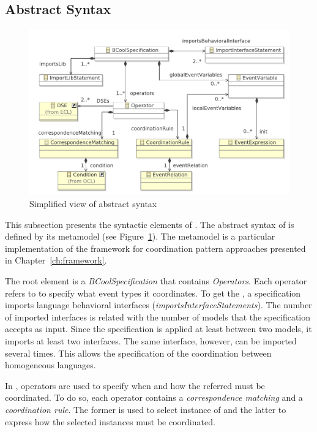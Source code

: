 \subsection{Abstract Syntax}
\begin{figure}
	\center
	\includegraphics[width=.8\textwidth]{bcool/figs/BcoolMM}
	\caption{Simplified view of \bcool abstract syntax}
	\label{fig:bcool}
\end{figure}

	
This subsection presents the syntactic elements of \bcool. The abstract syntax of \bcool is defined by its metamodel (see Figure~\ref{fig:bcool}). The metamodel is a particular implementation of the framework for coordination pattern approaches presented in Chapter~\ref{ch:framework}.  
	
The root element is a \emph{BCoolSpecification} that contains \emph{Operators}. Each operator refers to \dse to specify what event types it coordinates. To get the \dse, a \bcool specification imports language behavioral interfaces (\emph{importsInterfaceStatements}). The number of imported interfaces is related with the number of models that the specification accepts as input. Since the \bcool specification is applied at least between two models, it imports at least two interfaces. The same interface, however, can be imported several times. This allows the specification of the coordination between homogeneous languages.  

In \bcool, operators are used to specify when and how the referred \dse must be coordinated. To do so, each operator contains a \emph{correspondence matching} and a \emph{coordination rule}. The former is used to select instance of \dse and the latter to express how the selected instances must be coordinated. 

